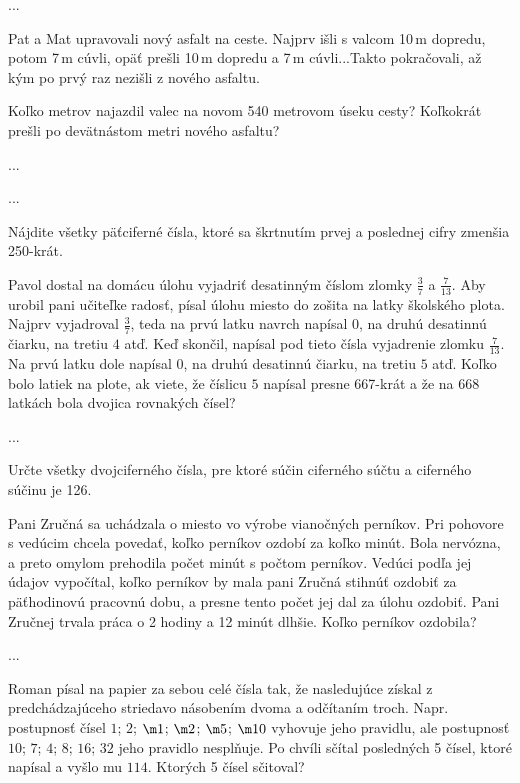 {%
...}

{%
Pat a Mat upravovali nový asfalt na ceste. Najprv išli s valcom 10\,m dopredu, potom 7\,m cúvli, opäť prešli 10\,m dopredu a 7\,m cúvli...Takto pokračovali, až kým po prvý raz nezišli z nového asfaltu.
\begin{itemize}
 Koľko metrov najazdil valec na novom 540 metrovom úseku cesty?
 Koľkokrát prešli po devätnástom metri nového asfaltu?
\end{itemize}
}

{%
...}

{%
...}

{%
Nájdite všetky päťciferné čísla, ktoré sa škrtnutím prvej a poslednej cifry zmenšia 250-krát.}

{%
Pavol dostal na domácu úlohu vyjadriť desatinným číslom zlomky $\frac37$ a $\frac7{13}$. Aby urobil pani učiteľke radosť, písal úlohu miesto do zošita na latky školského plota. Najprv vyjadroval $\frac37$, teda na prvú latku navrch napísal $0$, na druhú desatinnú čiarku, na tretiu $4$ atď. Keď skončil, napísal pod tieto čísla vyjadrenie zlomku $\frac7{13}$. Na prvú latku dole napísal $0$, na druhú desatinnú čiarku, na tretiu $5$ atď. Koľko bolo latiek na plote, ak viete, že číslicu $5$ napísal presne 667-krát a že na 668 latkách bola dvojica rovnakých čísel?}

{%
...}

{%
Určte všetky dvojciferného čísla, pre ktoré súčin ciferného súčtu a ciferného súčinu je 126.}

{%
Pani Zručná sa uchádzala o miesto vo výrobe vianočných perníkov. Pri pohovore s vedúcim chcela povedať, koľko perníkov ozdobí za koľko minút. Bola nervózna, a preto omylom prehodila počet minút s počtom perníkov. Vedúci podľa jej údajov vypočítal, koľko perníkov by mala pani Zručná stihnúť ozdobiť za päťhodinovú pracovnú dobu, a presne tento počet jej dal za úlohu ozdobiť. Pani Zručnej trvala práca o 2 hodiny a 12 minút dlhšie. Koľko perníkov ozdobila?}

{%
...}

{%
Roman písal na papier za sebou celé čísla tak, že nasledujúce získal z predchádzajúceho striedavo násobením dvoma a odčítaním troch. Napr. postupnosť čísel $1$; $2$; $\m1$; $\m2$; $\m5$; $\m10$ vyhovuje jeho pravidlu, ale postupnosť $10$; $7$; $4$; $8$; $16$; $32$ jeho pravidlo nesplňuje. Po chvíli sčítal posledných 5 čísel, ktoré napísal a vyšlo mu $114$. Ktorých 5 čísel sčitoval?}

